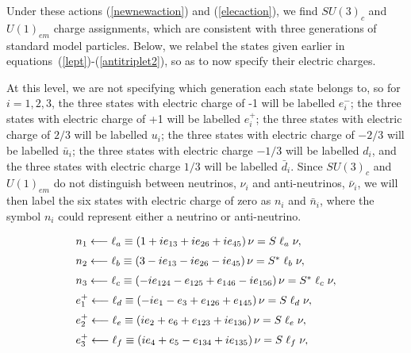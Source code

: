 \documentclass[letterpaper,12pt,titlepage,oneside,final]{book}
\newcommand{\spacer}{0.2cm}
\begin{document}
\noindent Under these actions (\ref{newnewaction}) and (\ref{elecaction}), we find $SU(3)_c$ and $U(1)_{em}$ charge assignments, which are consistent with three generations of standard model particles.  Below, we relabel the states given earlier in equations~(\ref{lept})-(\ref{antitriplet2}), so as to now specify their electric charges.  

At this level, we are not specifying which generation each state belongs to, so for $i=1,2,3$, the three states with electric charge of -1 will be labelled $e^-_i$;  the three states with electric charge of +1 will be labelled $e^+_i$; the three states with electric charge of $2/3$ will be labelled $u_i$;  the three states with electric charge of $-2/3$ will be labelled $\bar{u}_i$;  the three states with electric charge $-1/3$ will be labelled $d_i$, and  the three states with electric charge $1/3$ will be labelled $\bar{d}_i$.  Since $SU(3)_c$ and $U(1)_{em}$ do not distinguish between neutrinos, $\nu_i$ and anti-neutrinos, $\bar{\nu}_i$, we will then label the six states with electric charge of zero as $n _i$ and $\bar{n} _i$, where the symbol $n_i$ could represent either a neutrino or anti-neutrino.

 
\begin{equation}\begin{array}{l}\label{newlept}
n_1\longleftarrow\ell_{a}\equiv\left(1+ie_{13}+ie_{26}+ie_{45}\right)\nu = S\hspace{1mm}\ell_{a}\hspace{1mm}\nu,   \vspace{\spacer}\\
n_2\longleftarrow\ell_{b}\equiv\left(3-ie_{13}-ie_{26}-ie_{45}\right)\nu = S^*\hspace{1mm}\ell_{b}\hspace{1mm}\nu, \vspace{\spacer}\\
n_3\longleftarrow\ell_{c}\equiv \left(-ie_{124}-e_{125}+e_{146}-ie_{156}\right)\nu = S^*\hspace{1mm}\ell_{c}\hspace{1mm}\nu, \vspace{\spacer} \\
e^+_1\longleftarrow\ell_{d}\equiv \left(-ie_{1}-e_{3}+e_{126}+e_{145}\right)\nu = S\hspace{1mm}\ell_{d}\hspace{1mm}\nu, \vspace{\spacer} \\
e^+_2\longleftarrow\ell_{e}\equiv \left(ie_{2}+e_{6}+e_{123}+ie_{136}\right)\nu = S\hspace{1mm}\ell_{e}\hspace{1mm}\nu, \vspace{\spacer} \\
e^+_3\longleftarrow\ell_{f}\equiv \left(ie_{4}+e_{5}-e_{134}+ie_{135}\right)\nu = S\hspace{1mm}\ell_{f}\hspace{1mm}\nu, \vspace{\spacer} \\
\end{array}\end{equation}
\end{document}
